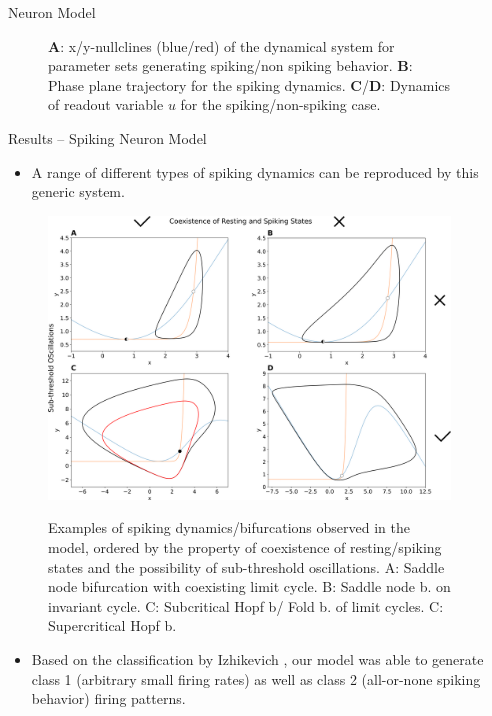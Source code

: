 \documentclass{beamer}
\begin{document}
\begin{frame}[t]
\begin{columns}
\begin{column}{.45\textwidth}
\begin{block}{Neuron Model}
\begin{figure}
\label{fig:dynamics_illustr}
\caption{\textbf{A}: x/y-nullclines (blue/red) of the dynamical system for parameter sets generating spiking/non spiking behavior. \textbf{B}: Phase plane trajectory for the spiking dynamics. \textbf{C}/\textbf{D}: Dynamics of readout variable $u$ for the spiking/non-spiking case.}
\end{figure}
\end{block}
\begin{block}{Results -- Spiking Neuron Model}
\begin{itemize}
\item A range of different types of spiking dynamics can be reproduced by this generic system.
\end{itemize}
\begin{figure}
\includegraphics[width=\textwidth]{../figures/graphics/bif_types_combined_figure.png}
\label{fig:bif_types_combined}
\caption{Examples of spiking dynamics/bifurcations observed in the model, ordered by the property of coexistence of resting/spiking states and the possibility of sub-threshold oscillations. A: Saddle node bifurcation with coexisting limit cycle. B: Saddle node b. on invariant cycle. C: Subcritical Hopf b/ Fold b. of limit cycles. C: Supercritical Hopf b.}
\end{figure}
\begin{itemize}
\item Based on the classification by Izhikevich \cite{Izhikevich_2007}, our model was able to generate class 1 (arbitrary small firing rates) as well as class 2 (all-or-none spiking behavior) firing patterns. 
\end{itemize}
\end{block}
\end{column}
\begin{column}{.45\textwidth}


\end{column}
\end{columns}
\end{frame}
\end{document}
